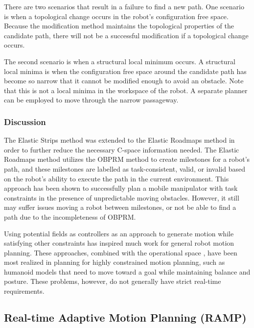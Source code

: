 \documentclass[10pt,conference]{ieeeconf}
\begin{document}


There are two scenarios that result in a failure to find a new path. One scenario is when a topological change occurs in the robot's configuration free space. Because the modification method maintains the topological properties of the candidate path, there will not be a successful modification if a topological change occurs.

The second scenario is when a structural local minimum occurs. A structural local minima is when the configuration free space around the candidate path has become so narrow that it cannot be modified enough to avoid an obstacle. Note that this is not a local minima in the workspace of the robot. A separate planner can be employed to move through the narrow passageway.

\subsubsection{Discussion}

The Elastic Strips method was extended to the Elastic Roadmaps method \cite{yang2009elastic} in order to further reduce the necessary C-space information needed. The Elastic Roadmaps method utilizes the OBPRM method to create milestones for a robot's path, and these milestones are labelled as task-consistent, valid, or invalid based on the robot's ability to execute the path in the current environment. This approach has been shown to successfully plan a mobile manipulator with task constraints in the presence of unpredictable moving obstacles. However, it still may suffer issues moving a robot between milestones, or not be able to find a path due to the incompleteness of OBPRM.

Using potential fields as controllers as an approach to generate motion while satisfying other constraints has inspired much work for general robot motion planning. These approaches, combined with the operational space \cite{khatib1987unified}, have been most realized in planning for highly constrained motion planning, such as humanoid models that need to move toward a goal while maintaining balance and posture. These problems, however, do not generally have strict real-time requirements.

\subsection{Real-time Adaptive Motion Planning (RAMP)}
	
\end{document}
